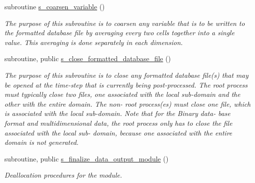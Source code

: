 \begin{DoxyCompactItemize}
\item 
subroutine \hyperlink{namespacem__data__output_ae32f7bdb38c6c216a819fb0b3a7e06cd}{s\+\_\+coarsen\+\_\+variable} ()
\begin{DoxyCompactList}\small\item\em The purpose of this subroutine is to coarsen any variable that is to be written to the formatted database file by averaging every two cells together into a single value. This averaging is done separately in each dimension. \end{DoxyCompactList}\item 
subroutine, public \hyperlink{namespacem__data__output_a9ab4e5bfbf085c126a58c78383d38fa7}{s\+\_\+close\+\_\+formatted\+\_\+database\+\_\+file} ()
\begin{DoxyCompactList}\small\item\em The purpose of this subroutine is to close any formatted database file(s) that may be opened at the time-\/step that is currently being post-\/processed. The root process must typically close two files, one associated with the local sub-\/domain and the other with the entire domain. The non-\/ root process(es) must close one file, which is associated with the local sub-\/domain. Note that for the Binary data-\/ base format and multidimensional data, the root process only has to close the file associated with the local sub-\/ domain, because one associated with the entire domain is not generated. \end{DoxyCompactList}\item 
subroutine, public \hyperlink{namespacem__data__output_a02f2b04a434c1f0ebf9156147d0f976e}{s\+\_\+finalize\+\_\+data\+\_\+output\+\_\+module} ()
\begin{DoxyCompactList}\small\item\em Deallocation procedures for the module. \end{DoxyCompactList}\end{DoxyCompactItemize}

